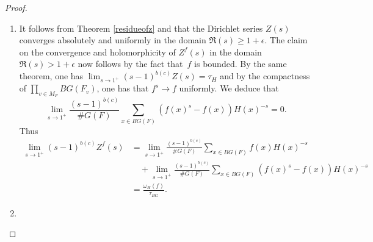 \documentclass[a4paper,english,12pt]{amsart}
\newcommand{\GG}{ G}
\newcommand{\CC}{\mathbb{C}}
\newcommand{\Ov}{\mathcal O _v}
\newcommand{\vMF}{v\in M_F}
\numberwithin{equation}{subsection}
\begin{document}
\begin{proof}
\begin{enumerate}
\item   It follows from Theorem \ref{residueofz} and \cite[Section 2.3, Proposition~7]{coursdarithmetique} that the Dirichlet series $Z(s)$ converges absolutely and uniformly in the domain $\Re(s)\geq 1+\epsilon$. The claim on the convergence and holomorphicity of $Z^f(s)$ in the domain $\Re(s)>1+\epsilon$ now follows by the fact that~$f$ is bounded. By the same theorem, one has $\lim_{s\to 1^+}(s-1)^{b(c)}Z(s)=\tau_H$ and by the compactness of $\prod_{\vMF}BG(F_v)$, one has that $f^s\to f$ uniformly. We deduce that $$\lim_{s\to 1^+}\frac{(s-1)^{b(c)}}{\# G(F)}\sum_{x\in BG(F)}(f(x)^s-f(x))H(x)^{-s}=0.$$ %
Thus
\begin{align*}\lim_{s\to 1^+}(s-1)^{b(c)}Z^f(s)&=\lim_{s\to 1^+}\frac{(s-1)^{b(c)}}{\# G(F)}\sum_{x\in BG(F)}f(x)H(x)^{-s}\\&\quad+\lim_{s\to 1^+}\frac{(s-1)^{b(c)}}{\# G(F)}\sum_{x\in BG(F)}(f(x)^s-f(x))H(x)^{-s}\\
&=\frac{\omega_H(f)}{\tau_{BG}}.
\end{align*}
\item %

\end{enumerate}
\end{proof}
\end{document}
